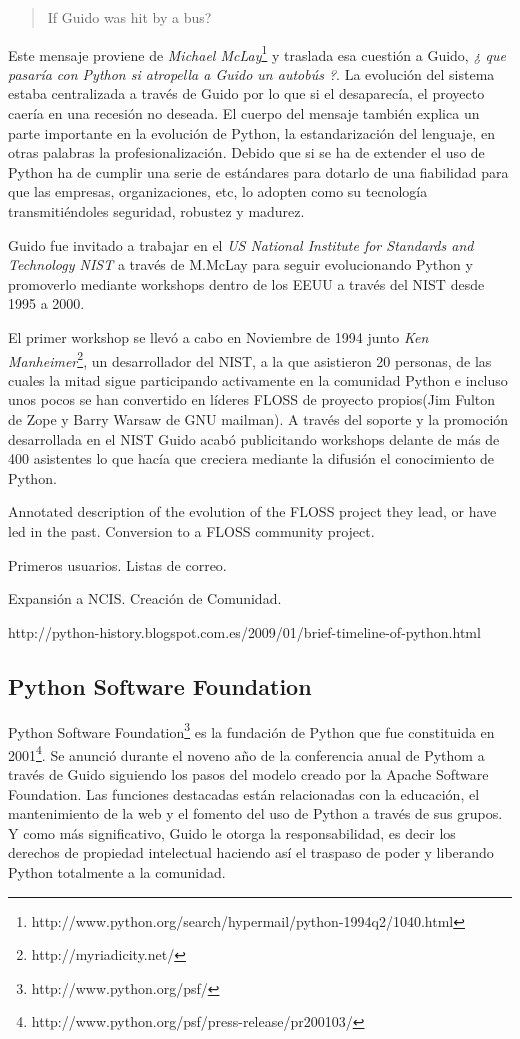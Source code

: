 \documentclass[11pt]{scrartcl}
\begin{document}
\begin{quote}
If Guido was hit by a bus?
\end{quote}

Este mensaje proviene de \emph{Michael McLay}\footnote{http://www.python.org/search/hypermail/python-1994q2/1040.html} y traslada esa cuestión a Guido, \emph{¿ que pasaría con Python si atropella a Guido un autobús ?}. La evolución del sistema estaba centralizada a través de Guido por lo que si el desaparecía, el proyecto caería en una recesión no deseada.
El cuerpo del mensaje también explica un parte importante en la evolución de Python, la estandarización del lenguaje, en otras palabras la profesionalización. Debido que si se ha de extender el uso de Python ha de cumplir una serie de estándares para dotarlo de una fiabilidad para que las empresas, organizaciones, etc, lo adopten como su tecnología transmitiéndoles seguridad, robustez y madurez.

Guido fue invitado a trabajar en el \emph{US National Institute for Standards and Technology NIST} a través de M.McLay para seguir evolucionando Python y promoverlo mediante workshops dentro de los EEUU a través del NIST desde 1995 a 2000.

El primer workshop se llevó a cabo en Noviembre de 1994 junto \emph{Ken Manheimer}\footnote{http://myriadicity.net/}, un desarrollador del NIST, a la que asistieron 20 personas, de las cuales la mitad sigue participando activamente en la comunidad Python e incluso unos pocos se han convertido en líderes FLOSS de proyecto propios(Jim Fulton de Zope y Barry Warsaw de GNU mailman). A través del soporte y la promoción desarrollada en el NIST Guido acabó publicitando workshops delante de más de 400 asistentes lo que hacía que creciera mediante la difusión el conocimiento de Python.

Annotated description of the evolution of the FLOSS project they lead, or have led in the past.
Conversion to a FLOSS community project.

Primeros usuarios.
Listas de correo.

Expansión a NCIS.
Creación de Comunidad.

http://python-history.blogspot.com.es/2009/01/brief-timeline-of-python.html

\subsection{Python Software Foundation}

Python Software Foundation\footnote{http://www.python.org/psf/} es la fundación de Python que fue constituida en 2001\footnote{http://www.python.org/psf/press-release/pr200103/}. Se anunció durante el noveno año de la conferencia anual de Pythom a través de Guido siguiendo los pasos del modelo creado por la Apache Software Foundation.
Las funciones destacadas están relacionadas con la educación, el mantenimiento de la web y el fomento del uso de Python a través de sus grupos. Y como más significativo, Guido le otorga la responsabilidad, es decir los derechos de propiedad intelectual haciendo así el traspaso de poder y liberando Python totalmente a la comunidad.
\end{document}
